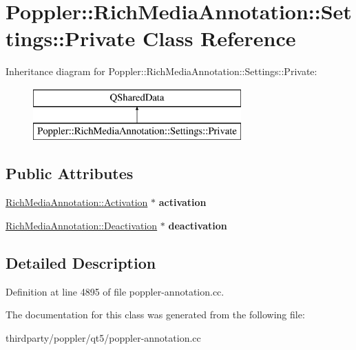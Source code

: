 \hypertarget{class_poppler_1_1_rich_media_annotation_1_1_settings_1_1_private}{}\section{Poppler\+:\+:Rich\+Media\+Annotation\+:\+:Settings\+:\+:Private Class Reference}
\label{class_poppler_1_1_rich_media_annotation_1_1_settings_1_1_private}
Inheritance diagram for Poppler\+:\+:Rich\+Media\+Annotation\+:\+:Settings\+:\+:Private\+:\begin{figure}[H]
\begin{center}
\leavevmode
\includegraphics[height=2.000000cm]{class_poppler_1_1_rich_media_annotation_1_1_settings_1_1_private}
\end{center}
\end{figure}
\subsection*{Public Attributes}
\begin{DoxyCompactItemize}
\item 
\mbox{\label{class_poppler_1_1_rich_media_annotation_1_1_settings_1_1_private_a501a3daec45883537ff131e620095505}} 
\hyperlink{class_poppler_1_1_rich_media_annotation_1_1_activation}{Rich\+Media\+Annotation\+::\+Activation} $\ast$ {\bfseries activation}
\item 
\mbox{\label{class_poppler_1_1_rich_media_annotation_1_1_settings_1_1_private_a2f1939248db24ba21358ef7bcbf5c649}} 
\hyperlink{class_poppler_1_1_rich_media_annotation_1_1_deactivation}{Rich\+Media\+Annotation\+::\+Deactivation} $\ast$ {\bfseries deactivation}
\end{DoxyCompactItemize}


\subsection{Detailed Description}


Definition at line 4895 of file poppler-\/annotation.\+cc.



The documentation for this class was generated from the following file\+:\begin{DoxyCompactItemize}
\item 
thirdparty/poppler/qt5/poppler-\/annotation.\+cc\end{DoxyCompactItemize}
